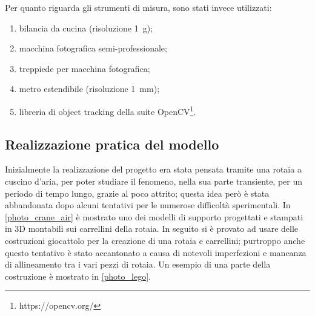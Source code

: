 \documentclass[11pt, a4paper, twoside, italian]{article}
\begin{document}
Per quanto riguarda gli strumenti di misura, sono stati invece utilizzati:
\begin{enumerate}
  \item bilancia da cucina (risoluzione \SI{1}{\g});
  \item macchina fotografica semi-professionale;
  \item treppiede per macchina fotografica;
  \item metro estendibile (risoluzione \SI{1}{\milli\m});
  \item libreria di object tracking della suite OpenCV\footnote{https://opencv.org/}.
\end{enumerate}
\subsection{Realizzazione pratica del modello}
Inizialmente la realizzazione del progetto era stata pensata tramite 
una rotaia a cuscino d'aria, per poter studiare il fenomeno, nella sua parte transiente, 
per un periodo di tempo lungo, grazie al poco attrito; questa idea però è stata abbandonata dopo alcuni tentativi per
le numerose difficoltà sperimentali. In \cref{photo_crane_air} è mostrato uno dei modelli di supporto
progettati e stampati in 3D montabili sui carrellini della rotaia.
In seguito si è provato ad usare delle costruzioni giocattolo per la creazione di una rotaia
e carrellini; purtroppo anche questo tentativo è stato accantonato a causa di 
notevoli imperfezioni e mancanza di allineamento tra i vari pezzi di rotaia. 
Un esempio di una parte della costruzione è mostrato in \cref{photo_lego}.
\end{document}
